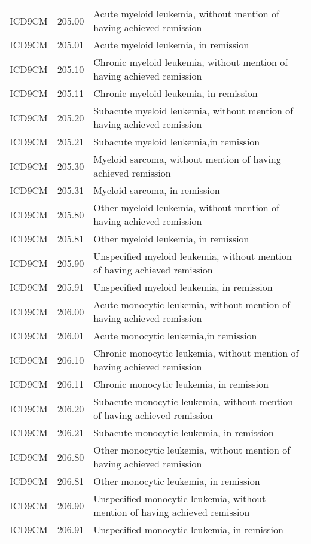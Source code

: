 \begin{longtable}{p{}p{}p{}}
  ICD9CM & 205.00 & Acute myeloid leukemia, without mention of having achieved remission \\ 
  ICD9CM & 205.01 & Acute myeloid leukemia, in remission \\ 
  ICD9CM & 205.10 & Chronic myeloid leukemia, without mention of having achieved remission \\ 
  ICD9CM & 205.11 & Chronic myeloid leukemia, in remission \\ 
  ICD9CM & 205.20 & Subacute myeloid leukemia, without mention of having achieved remission \\ 
  ICD9CM & 205.21 & Subacute myeloid leukemia,in remission \\ 
  ICD9CM & 205.30 & Myeloid sarcoma, without mention of having achieved remission \\ 
  ICD9CM & 205.31 & Myeloid sarcoma, in remission \\ 
  ICD9CM & 205.80 & Other myeloid leukemia, without mention of having achieved remission \\ 
  ICD9CM & 205.81 & Other myeloid leukemia, in remission \\ 
  ICD9CM & 205.90 & Unspecified myeloid leukemia, without mention of having achieved remission \\ 
  ICD9CM & 205.91 & Unspecified myeloid leukemia, in remission \\ 
  ICD9CM & 206.00 & Acute monocytic leukemia, without mention of having achieved remission \\ 
  ICD9CM & 206.01 & Acute monocytic leukemia,in remission \\ 
  ICD9CM & 206.10 & Chronic monocytic leukemia, without mention of having achieved remission \\ 
  ICD9CM & 206.11 & Chronic monocytic leukemia, in remission \\ 
  ICD9CM & 206.20 & Subacute monocytic leukemia, without mention of having achieved remission \\ 
  ICD9CM & 206.21 & Subacute monocytic leukemia, in remission \\ 
  ICD9CM & 206.80 & Other monocytic leukemia, without mention of having achieved remission \\ 
  ICD9CM & 206.81 & Other monocytic leukemia, in remission \\ 
  ICD9CM & 206.90 & Unspecified monocytic leukemia, without mention of having achieved remission \\ 
  ICD9CM & 206.91 & Unspecified monocytic leukemia, in remission \\ 

\end{longtable}
